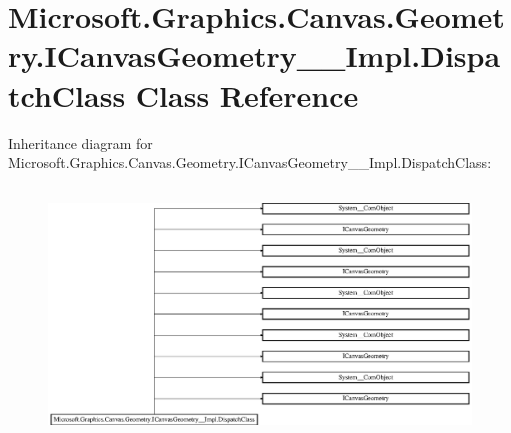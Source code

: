 \hypertarget{class_microsoft_1_1_graphics_1_1_canvas_1_1_geometry_1_1_i_canvas_geometry_____impl_1_1_dispatch_class}{}\section{Microsoft.\+Graphics.\+Canvas.\+Geometry.\+I\+Canvas\+Geometry\+\_\+\+\_\+\+Impl.\+Dispatch\+Class Class Reference}
\label{class_microsoft_1_1_graphics_1_1_canvas_1_1_geometry_1_1_i_canvas_geometry_____impl_1_1_dispatch_class}
Inheritance diagram for Microsoft.\+Graphics.\+Canvas.\+Geometry.\+I\+Canvas\+Geometry\+\_\+\+\_\+\+Impl.\+Dispatch\+Class\+:\begin{figure}[H]
\begin{center}
\leavevmode
\includegraphics[height=6.739606cm]{class_microsoft_1_1_graphics_1_1_canvas_1_1_geometry_1_1_i_canvas_geometry_____impl_1_1_dispatch_class}
\end{center}
\end{figure}
